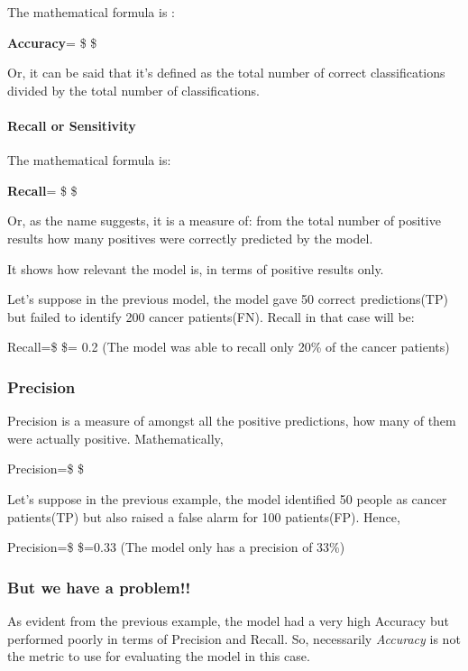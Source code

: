 \documentclass[11pt]{article}
\begin{document}
The mathematical formula is :

\textbf{Accuracy}= \$  \$

Or, it can be said that it's defined as the total number of correct
classifications divided by the total number of classifications.

    \paragraph{Recall or Sensitivity}\label{recall-or-sensitivity}

The mathematical formula is:

\textbf{Recall}= \$  \$

Or, as the name suggests, it is a measure of: from the total number of
positive results how many positives were correctly predicted by the
model.

It shows how relevant the model is, in terms of positive results only.

Let's suppose in the previous model, the model gave 50 correct
predictions(TP) but failed to identify 200 cancer patients(FN). Recall
in that case will be:

Recall=\$  \$= 0.2 (The model was able to recall
only 20\% of the cancer patients)

    \subsubsection{Precision}\label{precision}

Precision is a measure of amongst all the positive predictions, how many
of them were actually positive. Mathematically,

Precision=\$  \$

Let's suppose in the previous example, the model identified 50 people as
cancer patients(TP) but also raised a false alarm for 100 patients(FP).
Hence,

Precision=\$  \$=0.33 (The model only has a
precision of 33\%)

    \subsubsection{But we have a problem!!}\label{but-we-have-a-problem}

As evident from the previous example, the model had a very high Accuracy
but performed poorly in terms of Precision and Recall. So, necessarily
\emph{Accuracy} is not the metric to use for evaluating the model in
this case.
\end{document}
